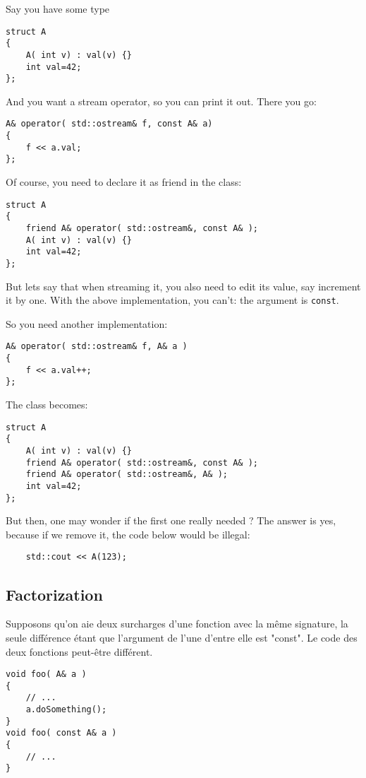 \documentclass[11pt,a4paper]{article}
\begin{document}
Say you have some type
\begin{lstlisting}
struct A
{
	A( int v) : val(v) {}
	int val=42;
};
\end{lstlisting}

And you want a stream operator, so you can print it out.
There you go:

\begin{lstlisting}
A& operator( std::ostream& f, const A& a)
{
	f << a.val;
};
\end{lstlisting}

Of course, you need to declare it as friend in the class:
\begin{lstlisting}
struct A
{
	friend A& operator( std::ostream&, const A& );
	A( int v) : val(v) {}
	int val=42;
};
\end{lstlisting}

But lets say that when streaming it, you also need to edit its value, say increment it by one.
With the above implementation, you can't: the argument is {\tt const}.

So you need another implementation:
\begin{lstlisting}
A& operator( std::ostream& f, A& a )
{
	f << a.val++;
};
\end{lstlisting}

The class becomes:
\begin{lstlisting}
struct A
{
	A( int v) : val(v) {}
	friend A& operator( std::ostream&, const A& );
	friend A& operator( std::ostream&, A& );
	int val=42;
};
\end{lstlisting}

But then, one may wonder if the first one really needed ?
The answer is yes, because if we remove it, the code below would be illegal:
\begin{lstlisting}
	std::cout << A(123);
\end{lstlisting}


\subsection{Factorization}
\label{ssec:facto1}

Supposons qu'on aie deux surcharges d'une fonction avec la même signature, la seule différence étant que l'argument de l'une d'entre elle est "const".
Le code des deux fonctions peut-être différent.
\begin{lstlisting}
void foo( A& a )
{
	// ...
	a.doSomething();
}
void foo( const A& a )
{
	// ...
}
\end{lstlisting}
\end{document}
